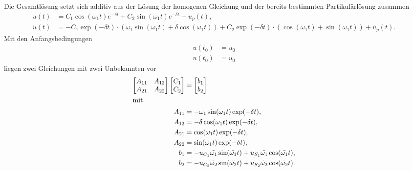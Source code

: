 \begin{solution}
    Die Gesamtlösung setzt sich additiv aus der Lösung der homogenen Gleichung und der bereits bestimmten Partikulärlösung zusammen
    \begin{align*}
        u(t) &= C_1\cos(\omega_1 t)e^{-\delta t} + C_2 \sin(\omega_1 t)e^{-\delta t} + u_p(t),\\
        \dot{u}(t) &= -C_1 \exp(-\delta t) \cdot (\omega_1 \sin(\omega_1 t) + \delta \cos(\omega_1 t)) + C_2 \exp(-\delta t) \cdot (\cos(\omega_1 t) + \sin(\omega_1 t)) + \dot{u_p}(t).
    \end{align*}
    Mit den Anfangsbedingungen
    \begin{align*}
        u(t_0) &= u_0 \\
        \dot{u}(t_0) &= \dot{u}_0
    \end{align*}
    liegen zwei Gleichungen mit zwei Unbekannten vor
    \begin{align*}
    \begin{bmatrix}
        A_{11} & A_{12}\\
        A_{21} & A_{22}
    \end{bmatrix}
    \begin{bmatrix}
        C_1 \\
        C_2
    \end{bmatrix}
    &=
    \begin{bmatrix}
    b_1 \\
    b_2
    \end{bmatrix} \\
    \intertext{mit}
        A_{11}&= -\omega_1 \sin(\omega_1 t) \exp(-\delta t),\\
        A_{12}&= - \delta \cos(\omega_1 t) \exp(-\delta t),\\
        A_{21}&= \cos(\omega_1 t) \exp(-\delta t),\\
        A_{22}&= \sin(\omega_1 t) \exp(-\delta t),\\
        b_{1}&= -u_{C_1} \tilde{\omega_1} \sin(\tilde{\omega_1}t) + u_{S_1} \tilde{\omega_1} \cos(\tilde{\omega_1}t),\\
        b_{2}&= -u_{C_2} \tilde{\omega_2} \sin(\tilde{\omega_2}t) + u_{S_2} \tilde{\omega_2} \cos(\tilde{\omega_2}t).
    \end{align*}


\end{solution}
